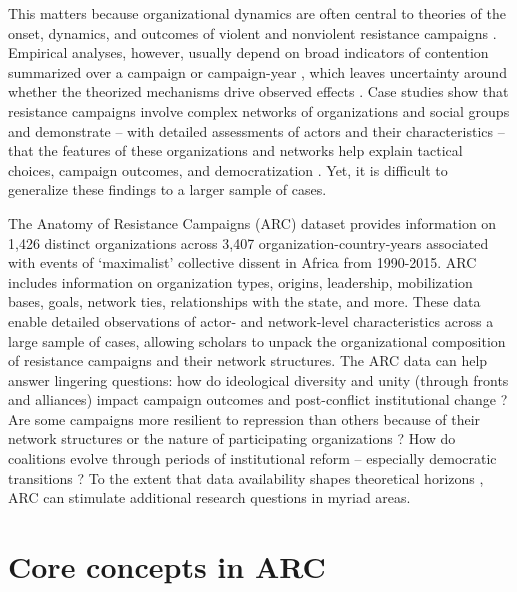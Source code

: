 This matters because organizational dynamics are often central to theories of the onset, dynamics, and outcomes of violent and nonviolent resistance campaigns \citep{Bethke2019a, Brancati2016, Chenoweth2011, Celestino2013, Huang2016, Schaftenaar2017, Thurber2019, Sutton2014, Svensson2011, Belgioioso2018}. Empirical analyses, however, usually depend on broad indicators of contention summarized over a campaign or campaign-year \citep{Chenoweth2011}, which leaves uncertainty around whether the theorized mechanisms drive observed effects \citep{Schock2005}. Case studies show that resistance campaigns involve complex networks of organizations and social groups \citep{Metternich2013, Schock2005, Osa2003} and demonstrate -- with detailed assessments of actors and their characteristics -- that the features of these organizations and networks help explain tactical choices, campaign outcomes, and democratization \citep{Pearlman2011, Thurber2019, Nepstad2011, Schock2005, Wood2000, Collier1999}. Yet, it is difficult to generalize these findings to a larger sample of cases.  

The Anatomy of Resistance Campaigns (ARC) dataset provides information on 1,426 distinct organizations across 3,407 organization-country-years associated with events of `maximalist' collective dissent in Africa from 1990-2015. ARC includes information on organization types, origins, leadership, mobilization bases, goals, network ties, relationships with the state, and more. These data enable detailed observations of actor- and network-level characteristics across a large sample of cases, allowing scholars to unpack the organizational composition of resistance campaigns and their network structures. The ARC data can help answer lingering questions: how do ideological diversity and unity (through fronts and alliances) impact campaign outcomes and post-conflict institutional change \citep{Chenoweth2011, Bayer2016, Celestino2013}? Are some campaigns more resilient to repression than others because of their network structures or the nature of participating organizations \citep{Sutton2014, Siegel2009}? How do coalitions evolve through periods of institutional reform -- especially democratic transitions \citep{Pinckney2020}? To the extent that data availability shapes theoretical horizons \citep{Gleditsch2014}, ARC can stimulate additional research questions in myriad areas.



\section{Core concepts in ARC}


